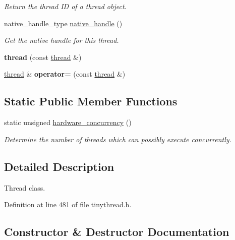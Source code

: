 \begin{DoxyCompactItemize}
\begin{DoxyCompactList}\small\item\em Return the thread ID of a thread object. \end{DoxyCompactList}\item 
native\+\_\+handle\+\_\+type \hyperlink{classtthread_1_1thread_a7f5b2962b96950d5d28286b5a078a18a}{native\+\_\+handle} ()
\begin{DoxyCompactList}\small\item\em Get the native handle for this thread. \end{DoxyCompactList}\item 
{\bfseries thread} (const \hyperlink{classtthread_1_1thread}{thread} \&)\hypertarget{classtthread_1_1thread_a898115a595749904b2d91aafab499d54}{}\label{classtthread_1_1thread_a898115a595749904b2d91aafab499d54}

\item 
\hyperlink{classtthread_1_1thread}{thread} \& {\bfseries operator=} (const \hyperlink{classtthread_1_1thread}{thread} \&)\hypertarget{classtthread_1_1thread_aefc961696dc1a9555abb27f1904b714a}{}\label{classtthread_1_1thread_aefc961696dc1a9555abb27f1904b714a}

\end{DoxyCompactItemize}
\subsection*{Static Public Member Functions}
\begin{DoxyCompactItemize}
\item 
static unsigned \hyperlink{classtthread_1_1thread_a1d851f61c8ab7ec39bbb87d01aaa320f}{hardware\+\_\+concurrency} ()
\begin{DoxyCompactList}\small\item\em Determine the number of threads which can possibly execute concurrently. \end{DoxyCompactList}\end{DoxyCompactItemize}


\subsection{Detailed Description}
Thread class. 

Definition at line 481 of file tinythread.\+h.



\subsection{Constructor \& Destructor Documentation}
